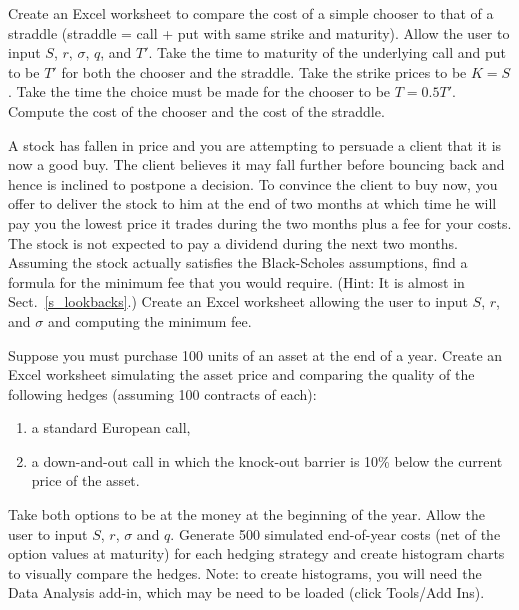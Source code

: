 \begin{prob}
\end{prob}\begin{prob} Create an Excel worksheet to compare the cost of a simple chooser to that of a straddle (straddle = call + put with same strike and maturity).  Allow the user to input $S$, $r$, $\sigma$, $q$, and $T'$.  Take the time to maturity of the underlying call and put to be $T'$ for both the chooser and the straddle.  Take the strike prices to be $K=S$.  Take the time the choice must be made for the chooser to be $T=0.5T'$.  Compute the cost of the chooser and the cost of the straddle.
\end{prob}\begin{prob} A stock has fallen in price and you are attempting to persuade a client that it is now a good buy.  The client believes it may fall further before bouncing back and hence is inclined to postpone a decision.  To convince the client to buy now, you offer to deliver the stock to him at the end of two months at which time he will pay you the lowest price it trades during the two months plus a fee for your costs.  The stock is not expected to pay a dividend during the next two months.  Assuming the stock actually satisfies the Black-Scholes assumptions, find a formula for the minimum fee that you would require.  (Hint:  It is almost in Sect.~\ref{s_lookbacks}.)  Create an Excel worksheet allowing the user to input $S$, $r$, and $\sigma$  and computing the minimum fee.
\end{prob}\begin{prob} \label{e_standardknockout} Suppose you must purchase 100 units of an asset at the end of a year.  Create an Excel worksheet simulating the asset price and comparing the quality of the following hedges (assuming 100 contracts of each):
\begin{enumerate}
\renewcommand{\labelenumi}{(\alph{enumi})}
\item a standard European call,
\item a down-and-out call in which the knock-out barrier is 10\% below the current price of the asset.
\end{enumerate}
Take both options to be at the money at the beginning of the year.  Allow the user to input $S$, $r$, $\sigma$ and $q$.   Generate 500 simulated end-of-year costs (net of the option values at maturity) for each hedging strategy and create histogram charts to visually compare the hedges.  Note: to create histograms, you will need the Data Analysis add-in, which may be need to be loaded (click Tools/Add Ins).
\end{prob}\begin{prob}\label{e_standardknockout2}

\end{prob}
